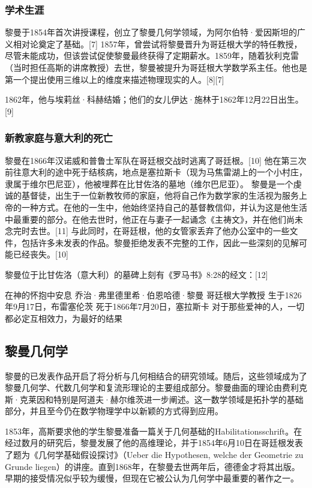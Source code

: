\subsubsection{学术生涯}  
黎曼于1854年首次讲授课程，创立了黎曼几何学领域，为阿尔伯特·爱因斯坦的广义相对论奠定了基础。[7] 1857年，曾尝试将黎曼晋升为哥廷根大学的特任教授，尽管未能成功，但该尝试促使黎曼最终获得了定期薪水。1859年，随着狄利克雷（当时担任高斯的讲席教授）去世，黎曼被提升为哥廷根大学数学系主任。他也是第一个提出使用三维以上的维度来描述物理现实的人。[8][7]

1862年，他与埃莉丝·科赫结婚；他们的女儿伊达·施林于1862年12月22日出生。[9]
\subsubsection{新教家庭与意大利的死亡}
黎曼在1866年汉诺威和普鲁士军队在哥廷根交战时逃离了哥廷根。[10] 他在第三次前往意大利的途中死于结核病，地点是塞拉斯卡（现为马焦雷湖上的一个小村庄，隶属于维尔巴尼亚），他被埋葬在比甘佐洛的墓地（维尔巴尼亚）。  
黎曼是一个虔诚的基督徒，出生于一位新教牧师的家庭，他将自己作为数学家的生活视为服务上帝的一种方式。在他的一生中，他始终坚持自己的基督教信仰，并认为这是他生活中最重要的部分。在他去世时，他正在与妻子一起诵念《主祷文》，并在他们尚未念完时去世。[11] 与此同时，在哥廷根，他的女管家丢弃了他办公室中的一些文件，包括许多未发表的作品。黎曼拒绝发表不完整的工作，因此一些深刻的见解可能已经丧失。[10]

黎曼位于比甘佐洛（意大利）的墓碑上刻有《罗马书》8:28的经文：[12]

在神的怀抱中安息
乔治·弗里德里希·伯恩哈德·黎曼
哥廷根大学教授
生于1826年9月17日，布雷塞伦茨
死于1866年7月20日，塞拉斯卡
对于那些爱神的人，一切都必定互相效力，为最好的结果
\subsection{黎曼几何学}
黎曼的已发表作品开启了将分析与几何相结合的研究领域。随后，这些领域成为了黎曼几何学、代数几何学和复流形理论的主要组成部分。黎曼曲面的理论由费利克斯·克莱因和特别是阿道夫·赫尔维茨进一步阐述。这一数学领域是拓扑学的基础部分，并且至今仍在数学物理学中以新颖的方式得到应用。

1853年，高斯要求他的学生黎曼准备一篇关于几何基础的Habilitationsschrift。在经过数月的研究后，黎曼发展了他的高维理论，并于1854年6月10日在哥廷根发表了题为《几何学基础假设探讨》（Ueber die Hypothesen, welche der Geometrie zu Grunde liegen）的讲座。直到1868年，在黎曼去世两年后，德德金才将其出版。早期的接受情况似乎较为缓慢，但现在它被公认为几何学中最重要的著作之一。

